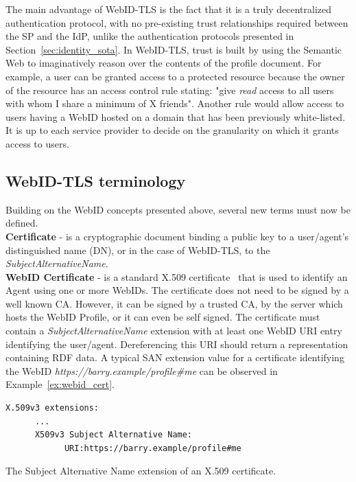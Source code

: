 The main advantage of WebID-TLS is the fact that it is a truly decentralized authentication protocol, with no pre-existing trust relationships required between the SP and the IdP, unlike the authentication protocols presented in Section~\ref{sec:identity_sota}. In WebID-TLS, trust is built by using the Semantic Web to imaginatively reason over the contents of the profile document. For example, a user can be granted access to a protected resource because the owner of the resource has an access control rule stating: "give \textit{read} access to all users with whom I share a minimum of X friends". Another rule would allow access to users having a WebID hosted on a domain that has been previously white-listed. It is up to each service provider to decide on the granularity on which it grants access to users.

\subsection{WebID-TLS terminology}
\label{subsec:webid-tls_terms}
Building on the WebID concepts presented above, several new terms must now be defined.\\

\textbf{Certificate} - is a cryptographic document binding a public key to a user/agent's distinguished name (DN), or in the case of WebID-TLS, to the \textit{SubjectAlternativeName}.\\

\textbf{WebID Certificate} - is a standard X.509 certificate~\cite{solo1999internet} that is used to identify an Agent using one or more WebIDs. The certificate does not need to be signed by a well known CA. However, it can be signed by a trusted CA, by the server which hosts the WebID Profile, or it can even be self signed. The certificate must contain a \textit{SubjectAlternativeName} extension with at least one WebID URI entry identifying the user/agent. Dereferencing this URI should return a representation containing RDF data.  A typical SAN extension value for a certificate identifying the WebID \textit{https://barry.example/profile\#me} can be observed in Example~\ref{ex:webid_cert}.\\

\begin{example}
\begin{verbatim}
X.509v3 extensions:
      ...
      X509v3 Subject Alternative Name:
            URI:https://barry.example/profile#me
\end{verbatim}
\caption{The Subject Alternative Name extension of an X.509 certificate.}
\label{ex:webid_cert}
\end{example}

